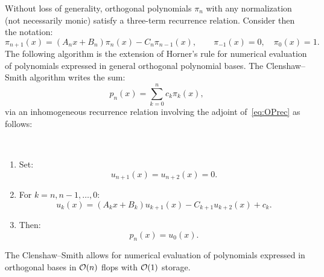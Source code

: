 Without loss of generality, orthogonal polynomials $\pi_n$ with any normalization (not necessarily monic) satisfy a three-term recurrence relation. Consider then the notation:
\begin{equation}\label{eq:OPrec}
\pi_{n+1}(x) = (A_nx+B_n)\pi_n(x) -C_n\pi_{n-1}(x),\qquad \pi_{-1}(x) = 0,\quad \pi_0(x) = 1.
\end{equation}
The following algorithm is the extension of Horner's rule for numerical evaluation of polynomials expressed in general orthogonal polynomial bases. The Clenshaw--Smith algorithm writes the sum:
\begin{equation}
p_n(x) = \sum_{k=0}^n c_k \pi_k(x),
\end{equation}
via an inhomogeneous recurrence relation involving the adjoint of~\eqref{eq:OPrec} as follows:
\begin{algorithm}~
\begin{enumerate}
\item Set:
\begin{equation}
u_{n+1}(x) = u_{n+2}(x) = 0.
\end{equation}
\item For $k=n,n-1,\ldots,0$:
\begin{equation}
u_k(x) = (A_kx+B_k)u_{k+1}(x) - C_{k+1}u_{k+2}(x) + c_k.
\end{equation}
\item Then:
\begin{equation}
p_n(x) = u_0(x).
\end{equation}
\end{enumerate}
\end{algorithm}

The Clenshaw--Smith allows for numerical evaluation of polynomials expressed in orthogonal bases in $\mathcal{O}(n)$ flops with $\mathcal{O}(1)$ storage.

